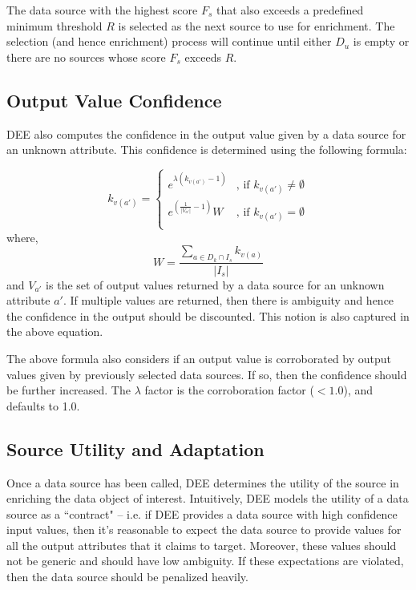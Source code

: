 The data source with the highest score $F_s$ that also exceeds a predefined minimum threshold $R$ is selected
as the next source to use for enrichment. The selection (and hence enrichment) process will continue until
either $D_u$ is empty or there are no sources whose score $F_s$ exceeds $R$.


\subsection{Output Value Confidence} 

DEE also computes the confidence in the output value given by a data source for an unknown attribute. 
This confidence is determined using the following formula: 

\begin{equation}
 \label{_output_confidence}
k_{v(a')} = \left\lbrace 
		\begin{array}{ll}
			e^{\lambda(k_{v(a')} - 1)} 						& \mbox{, if } k_{v(a')} \neq \emptyset \\
			e^{ \left( \frac{1}{|V_{a'}|} - 1 \right) } W \nonumber  	& \mbox{, if } k_{v(a')} = \emptyset \\
		\end{array}
		\right.
\end{equation}
where,  
\begin{equation}
	W = \frac{\displaystyle\sum\limits_{a \in D_k \cap I_s} k_{v(a)} }{|I_s|}
\end{equation}
and $V_{a'}$ is the set of output values returned by a data source for an unknown attribute $a'$. If 
multiple values are returned, then there is ambiguity and hence the confidence in the output should 
be discounted. This notion is also captured in the above equation.

The above formula also considers if an output value is corroborated by output values given by previously
selected data sources. If so, then the confidence should be further increased. The $\lambda$ factor is
the corroboration factor ($< 1.0$), and defaults to 1.0.


\subsection{Source Utility and Adaptation}

Once a data source has been called, DEE determines the utility of the source in enriching the data
object of interest. Intuitively, DEE models the utility of a data source as a ``contract" -- i.e. if 
DEE provides a data source with high confidence input values, then it's reasonable to expect the data
source to provide values for all the output attributes that it claims to target. Moreover, these values 
should not be generic and should have low ambiguity. If these expectations are violated, then the data 
source should be penalized heavily. 

